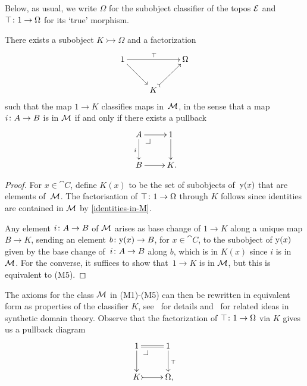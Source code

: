 \documentclass[reqno,10pt,a4paper,oneside,draft]{amsart}
\begin{document}
{{Below, as usual, we write $\Omega$ for the subobject classifier of the topos $\cal{E}$ and $\top \co 1 \to \Omega$ for its `true' morphism.

\begin{lemma} \label{partial-map-classifier}
There exists a subobject $K \rightarrowtail \Omega$ and a factorization
\[
\xymatrix{
  1
  \ar[rr]^\top
  \ar[dr]
&&
  \Omega
\\
&
  K
  \ar@{>->}[ur]
}
\]
such that the map $1 \to K$ classifies maps in~$\cal{M}$, in the sense that a map
$i \co A \to B$ is in $\cal{M}$ if and only if there exists a pullback
\[
\xymatrix{
  A
  \ar[r]
  \ar[d]_i
  \drpullback
&
  1
  \ar[d]
\\
  B
  \ar[r]
&
  K
\rlap{.}}
\]
\end{lemma}

\begin{proof}
For $x \in \cat{C}$, define $K(x)$ to be the set of subobjects of~$\yon(x)$ that are elements of~$\cal{M}$.
The factorisation of $\top \co 1 \to \Omega$ through $K$ follows since identities are contained in $\cal{M}$ by \cref{identities-in-M}.

Any element $i \co A \to B$ of $\cal{M}$ arises as base change of $1 \to K$ along a unique map $B \to K$, sending an element $b \co \yon(x) \to B$, for $x \in \cat{C}$, to the subobject of $\yon(x)$ given by the base change of~$i \co A  \to B$ along $b$, which is in $K(x)$ since $i$ is in $\cal{M}$.
For the converse, it suffices to show that~$1 \to K$ is in $\cal{M}$, but this is equivalent to (M5).
\end{proof}

The axioms for the class $\cal{M}$ in (M1)-(M5) can then be rewritten in equivalent form as properties of the classifier $K$, see~\cite{PittsAM:aximct} for details and~\cite{HylandM:firssd,RosoliniG:phd} for related ideas in synthetic domain
theory.
Observe that the factorization of $\top \co 1 \to \Omega$ via $K$ gives us a pullback diagram
\begin{equation} \label{partial-map-classifier:0}
\begin{gathered}
\xymatrix{
  1
  \ar@{=}[r]
  \ar[d]
  \pullback{dr}
&
  1
  \ar[d]^{\top}
\\
  K
  \ar@{>->}[r]
&
  \Omega \rlap{,}
}
\end{gathered}
\end{equation}

}}
\end{document}
